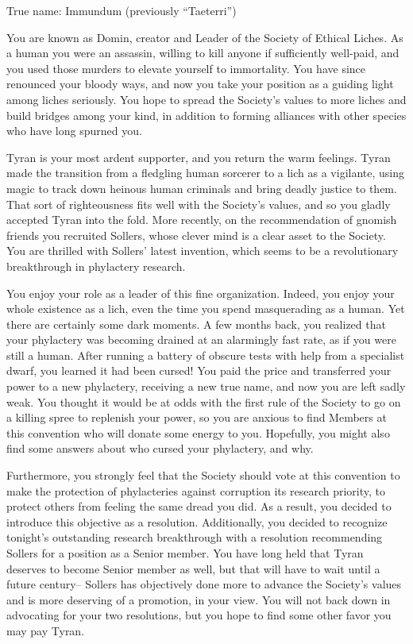 \documentclass[char]{Sel}
\begin{document}
\name{\cDomin{}}

True name: Immundum (previously “Taeterri”)

You are known as Domin, creator and Leader of the Society of Ethical Liches. As a human you were an assassin, willing to kill anyone if sufficiently well-paid, and you used those murders to elevate yourself to immortality. You have since renounced your bloody ways, and now you take your position as a guiding light among liches seriously. You hope to spread the Society's values to more liches and build bridges among your kind, in addition to forming alliances with other species who have long spurned you.

Tyran is your most ardent supporter, and you return the warm feelings. Tyran made the transition from a fledgling human sorcerer to a lich as a vigilante, using magic to track down heinous human criminals and bring deadly justice to them. That sort of righteousness fits well with the Society's values, and so you gladly accepted Tyran into the fold. More recently, on the recommendation of gnomish friends you recruited Sollers, whose clever mind is a clear asset to the Society. You are thrilled with Sollers' latest invention, which seems to be a revolutionary breakthrough in phylactery research.

You enjoy your role as a leader of this fine organization. Indeed, you enjoy your whole existence as a lich, even the time you spend masquerading as a human. Yet there are certainly some dark moments. A few months back, you realized that your phylactery was becoming drained at an alarmingly fast rate, as if you were still a human. After running a battery of obscure tests with help from a specialist dwarf, you learned it had been cursed! You paid the price and transferred your power to a new phylactery, receiving a new true name, and now you are left sadly weak. You thought it would be at odds with the first rule of the Society to go on a killing spree to replenish your power, so you are anxious to find Members at this convention who will donate some energy to you. Hopefully, you might also find some answers about who cursed your phylactery, and why.

Furthermore, you strongly feel that the Society should vote at this convention to make the protection of phylacteries against corruption its research priority, to protect others from feeling the same dread you did. As a result, you decided to introduce this objective as a resolution. Additionally, you decided to recognize tonight's outstanding research breakthrough with a resolution recommending Sollers for a position as a Senior member. You have long held that Tyran deserves to become Senior member as well, but that will have to wait until a future century-- Sollers has objectively done more to advance the Society's values and is more deserving of a promotion, in your view. You will not back down in advocating for your two resolutions, but you hope to find some other favor you may pay Tyran.
\end{document}

